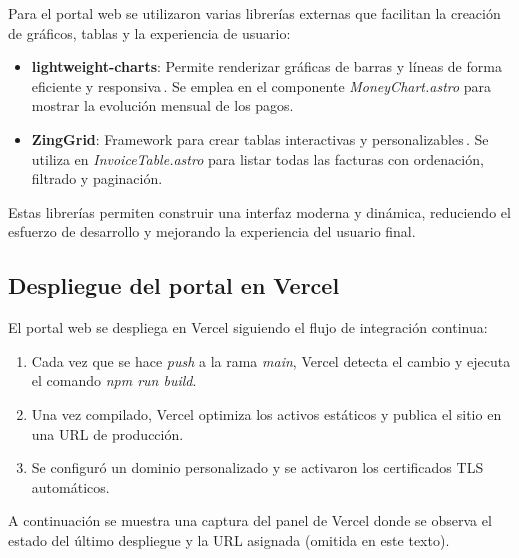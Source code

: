 \begin{large}

Para el portal web se utilizaron varias librerías externas que facilitan la creación de gráficos, tablas y la experiencia de usuario:

\begin{itemize}
    \item \textbf{lightweight-charts}: Permite renderizar gráficas de barras y líneas de forma eficiente y responsiva\,\cite{lightweight_charts}. Se emplea en el componente \textit{MoneyChart.astro} para mostrar la evolución mensual de los pagos.
    \item \textbf{ZingGrid}: Framework para crear tablas interactivas y personalizables\,\cite{zinggrid}. Se utiliza en \textit{InvoiceTable.astro} para listar todas las facturas con ordenación, filtrado y paginación.
\end{itemize}

Estas librerías permiten construir una interfaz moderna y dinámica, reduciendo el esfuerzo de desarrollo y mejorando la experiencia del usuario final.

\end{large}

\subsection{Despliegue del portal en Vercel}

\begin{large}
	
El portal web se despliega en Vercel siguiendo el flujo de integración continua:

\begin{enumerate}
  \item Cada vez que se hace \emph{push} a la rama \textit{main}, Vercel detecta el cambio y ejecuta el comando \textit{npm run build}.
  \item Una vez compilado, Vercel optimiza los activos estáticos y publica el sitio en una URL de producción.
  \item Se configuró un dominio personalizado y se activaron los certificados TLS automáticos.
\end{enumerate}

A continuación se muestra una captura del panel de Vercel donde se observa el estado del último despliegue y la URL asignada (omitida en este texto).

\end{large}
